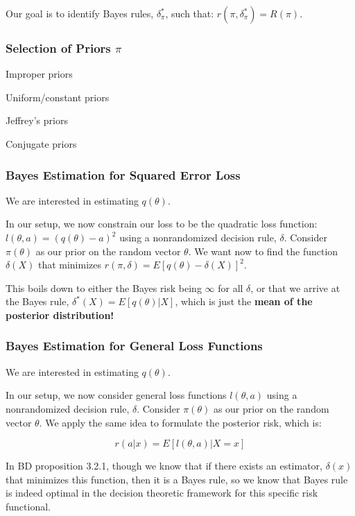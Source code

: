 		Our goal is to identify Bayes rules, $\delta_\pi^*$, such that: $r(\pi, \delta_\pi^*) = R(\pi)$.

		\subsubsection{Selection of Priors $\pi$}
			
			Improper priors

			Uniform/constant priors 

			Jeffrey's priors

			Conjugate priors

		\subsubsection{Bayes Estimation for Squared Error Loss}

			We are interested in estimating $q(\theta)$.

			In our setup, we now constrain our loss to be the quadratic loss function: $l(\theta, a) = (q(\theta) - a)^2$ using a nonrandomized decision rule, $\delta$. Consider $\pi(\theta)$ as our prior on the random vector $\theta$. We want now to find the function $\delta(X)$ that minimizes $r(\pi, \delta) = E[ q(\theta) - \delta(X) ]^2$.

			This boils down to either the Bayes risk being $\infty$ for all $\delta$, or that we arrive at the Bayes rule, $\delta^*(X) = E[ q(\theta) | X ]$, which is just the \textbf{mean of the posterior distribution!}

		\subsubsection{Bayes Estimation for General Loss Functions}

			We are interested in estimating $q(\theta)$.

			In our setup, we now consider general loss functions $l(\theta, a)$ using a nonrandomized decision rule, $\delta$. Consider $\pi(\theta)$ as our prior on the random vector $\theta$. We apply the same idea to formulate the posterior risk, which is:

			$$r(a | x) = E [ l(\theta, a) | X=x ]$$

			In BD proposition 3.2.1, though we know that if there exists an estimator, $\delta(x)$ that minimizes this function, then it is a Bayes rule, so we know that Bayes rule is indeed optimal in the decision theoretic framework for this specific risk functional.


